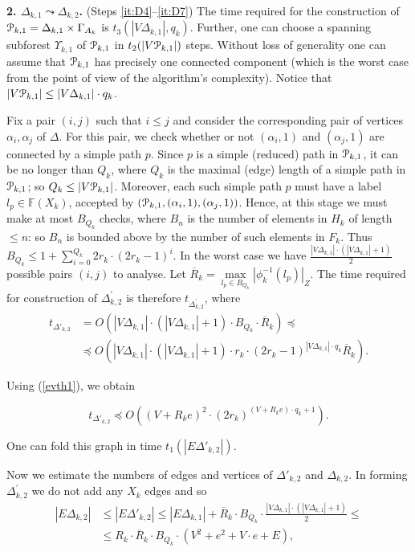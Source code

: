 \documentclass[a4paper,12pt]{article}
\renewcommand{\a}{\alpha }
\newcommand{\G}{\Gamma }
\newcommand{\D}{\Delta }
\newcommand{\U}{\Upsilon }
\newcommand{\cP}{{\cal{P}}}
\numberwithin{equation}{section}
\numberwithin{figure}{section}
\newcommand{\FF}{\ensuremath{\mathbb{F}}}
\begin{document}
{\bf 2. $\D_{k,1} \leadsto \D_{k,2}$.}  (Steps \ref{it:D4}--\ref{it:D7}) The time required for the
construction of $\cP_{k,1}=\D_{k,1}\times \G_{A_k}$ is $t_3(|V \D_{k,1}|, q_k)$.
Further, one can choose a spanning subforest $\U_{k,1}$ of $\cP_{k,1}$ in
$t_2(|V\cP_{k,1}|)$ steps. Without loss of generality one can assume
that $\cP_{k,1}$ has precisely one connected component (which is the
worst case from the point of view of the algorithm's complexity).
Notice that $|V\cP_{k,1}| \le |V\D_{k,1}|\cdot q_k$.


Fix a pair $(i, j)$ such that $i \le j$ and consider the
corresponding pair of vertices $\a_i,\a_j$ of $\D$. For this pair, we check
whether or not $(\a_i,1)$ and $(\a_j,1)$ are
connected by a  simple path $p$.
Since $p$ is a
simple (reduced) path in $\cP_{k,1}$, it can be no longer than $Q_k$,
where $Q_k$ is the maximal (edge) length of a simple path in $\cP_{k,1}$;
so $Q_k \le |V\cP_{k,1}|$.
Moreover, each such  simple path $p$ must have a label $l_p \in \FF(X_k)$,
accepted by $(\cP_{k,1},(\a_i,1),(\a_j,1))$. Hence, at
 this stage we must make
at most $B_{Q_k}$ checks, where $B_n$ is the number of elements in
$H_k$ of length $\le n$: so $B_{n}$ is bounded above by the number
of such elements in $F_k$. Thus $B_{Q_k} \le 1+
\mathop{\sum}\limits_{i=0}^{Q_k} 2 r_k \cdot (2r_k-1)^{i}$. In the
worst case we have $\frac{|V\D_{k,1}|\cdot(|V\D_{k,1}|+1)}{2}$ possible
pairs $(i,j)$ to analyse. Let $\overline{R}_k=\max\limits_{l_p \in
B_{Q_k}}|\phi^{-1}_k(l_p)|_Z$.
 The time required for construction of $\D_{k,2}^\prime$ is therefore $t_{\D_{k,2}^\prime}$,
where
\begin{equation}\label{pretheta'2}
\begin{split}
t_{\D'_{k,2}} &= O(|V\D_{k,1}|\cdot(|V\D_{k,1}|+1)\cdot B_{Q_k}
\cdot \overline{R}_k)\preceq\\
&\preceq O(|V\D_{k,1}|\cdot(|V\D_{k,1}|+1)\cdot r_k \cdot
(2r_k-1)^{|V\D_{k,1}|\cdot q_k}\overline{R}_k).
\end{split}
\end{equation}

Using (\ref{evth1}), we obtain

\begin{equation}\label{theta'2}
t_{\D'_{k,2}} \preceq O((V + R_k e)^2\cdot (2r_k)^{(V +
R_k e)\cdot q_k +1}).
\end{equation}

One can fold this graph in time $t_1(|E\D'_{k,2}|)$.

Now we estimate the numbers of edges  and vertices  of $\D'_{k,2}$ and
$\D_{k,2}$. In forming $\D_{k,2}^\prime$  we do not add any $X_k$ edges
and so
\begin{equation}\label{etheta2}
\begin{split}
|E\D_{k,2}| &\le |E\D'_{k,2}| \le |E\D_{k,1}|+\overline{R}_k\cdot B_{Q_k}
\cdot \frac{|V\D_{k,1}|\cdot(|V\D_{k,1}|+1)}{2}\le\\
&\le R_k\cdot 
\overline{R}_k\cdot B_{Q_k} \cdot (V^2 + e^2+V\cdot e+E),
\end{split}
\end{equation}
\end{document}

